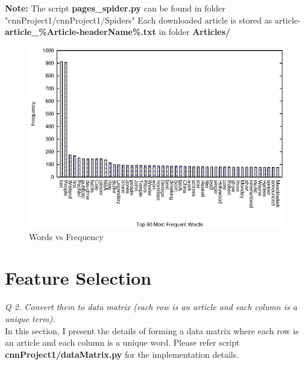 \documentclass[journal,onecolumn]{IEEEtran}
\begin{document}
\textbf{Note: } The script \textbf{pages\_spider.py} can be found in folder "cnnProject1/cnnProject1/Spiders"
Each downloaded article is stored as article- \textbf{article\_\%Article-headerName\%.txt} in folder \textbf{Articles/}


\begin{figure}[h]
\begin{center}
 \includegraphics[scale=1.1] {Plots/wordFreq_allArticles.eps}
 \caption {Words vs Frequency}
 \end{center}
\end{figure}



\section{\textbf{Feature Selection}}
\textit{Q 2. Convert them to data matrix (each row is an article and each column is a unique term).}\\

In this section, I present the details of forming a data matrix where each row is an article and each column is a unique word. Please refer script \textbf{cnnProject1/dataMatrix.py} for the implementation details.
\end{document}
